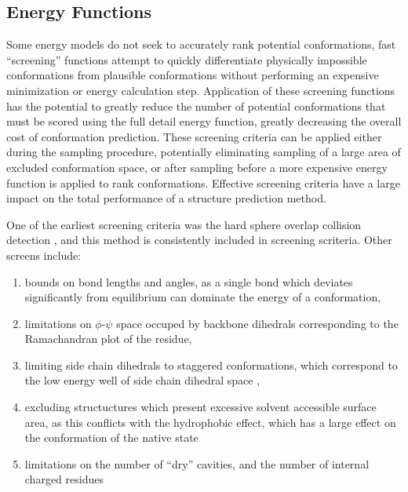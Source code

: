 \subsection{Energy Functions}
\label{subsection:energy_functions}
Some energy models do not seek to accurately rank potential conformations, fast ``screening'' functions attempt to quickly differentiate physically impossible conformations from plausible conformations without performing an expensive minimization or energy calculation step.
Application of these screening functions has the potential to greatly reduce the number of potential conformations that must be scored using the full detail energy function, greatly decreasing the overall cost of conformation prediction.
These screening criteria can be applied either during the sampling procedure, potentially eliminating sampling of a large area of excluded conformation space, or after sampling before a more expensive energy function is applied to rank conformations.
Effective screening criteria have a large impact on the total performance of a structure prediction method.

One of the earliest screening criteria was the hard sphere overlap collision detection \cite{levinthal1966molecular}, and this method is consistently included in screening scriteria.
Other screens include:
\begin{enumerate}
\item bounds on bond lengths and angles, as a single bond which deviates significantly from equilibrium can dominate the energy of a conformation,
\item limitations on $\phi$-$\psi$ space occuped by backbone dihedrals corresponding to the Ramachandran plot of the residue,
\item limiting side chain dihedrals to staggered conformations, which correspond to the low energy well of side chain dihedral space \cite{moult1986algorithm},
\item excluding structuctures which present excessive solvent accessible surface area, as this conflicts with the hydrophobic effect, which has a large effect on the conformation of the native state \cite{chothia1975principles}
\item limitations on the number of ``dry'' cavities, and the number of internal charged residues \cite{moult1986algorithm}
\end{enumerate}

